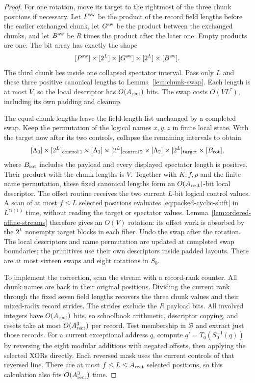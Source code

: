 \documentclass[11pt]{article}
\theoremstyle{definition}
\begin{document}
\begin{proof}
For one rotation, move its target to the rightmost of the three chunk
positions if necessary. Let $P^{\rm sw}$ be the product of the record
field lengths before the earlier exchanged chunk, let $G^{\rm sw}$
be the product between the exchanged chunks, and let $B^{\rm sw}$ be
$R$ times the product after the later one. Empty products are one.
The bit array has exactly the shape
\[
 [P^{\rm sw}]\times[2^L]\times[G^{\rm sw}]
       \times[2^L]\times[B^{\rm sw}].
\]
The third chunk lies inside one collapsed spectator interval.
Pass only $L$ and these three positive canonical lengths to
Lemma~\ref{lem:chunk-swap}. Each length is at most $V$, so the local
descriptor has $O(A_{\rm rect})$ bits. The swap costs $O(VL^\tau)$, including
its own padding and cleanup.

The equal chunk lengths leave the field-length list unchanged by a
completed swap. Keep the permutation of the logical names $x,y,z$ in
finite local state. With the target now after its two controls, collapse
the remaining intervals to obtain
\[
 [\Lambda_0]\times[2^L]_{\rm control\,1}\times[\Lambda_1]
 \times[2^L]_{\rm control\,2}\times[\Lambda_2]
 \times[2^L]_{\rm target}\times[B_{\rm rot}],
\]
where $B_{\rm rot}$ includes the payload and every displayed spectator
length is positive. Their product with the chunk lengths is $V$.
Together with $K,f,\rho$ and the finite name permutation, these fixed
canonical lengths form an $O(A_{\rm rect})$-bit local descriptor. The offset
routine receives the two current $L$-bit logical control values. A scan
of at most $f\le L$ selected positions evaluates
\eqref{eq:packed-cyclic-shift} in $L^{O(1)}$ time, without reading the
target or spectator values. Lemma~\ref{lem:ordered-affine-streams}
therefore gives an $O(V)$ rotation: its offset work is absorbed by the
$2^L$ nonempty target blocks in each fiber. Undo the swap after the
rotation. The local descriptors and name permutation are updated at
completed swap boundaries; the primitives use their own descriptors
inside padded layouts.
There are at most sixteen swaps and eight rotations in $S_0$.

To implement the correction, scan the stream with a record-rank counter.
All chunk names are back in their original positions. Dividing the
current rank through the fixed seven field lengths recovers the three
chunk values and their mixed-radix record strides. The strides exclude
the $R$ payload bits. All involved integers have $O(A_{\rm rect})$ bits, so
schoolbook arithmetic, descriptor copying, and resets take at most
$O(A_{\rm rect}^3)$ per record. Test membership in $\mathcal B$ and extract just
those records. For a current exceptional address $q$, compute
$q'=T_0(S_0^{-1}(q))$ by reversing the eight modular additions with
negated offsets, then applying the selected XORs directly. Each reversed
mask uses the current controls of that reversed line. There are at most
$f\le L\le A_{\rm rect}$ selected positions, so this calculation also fits
$O(A_{\rm rect}^3)$ time.


\end{proof}
\end{document}

